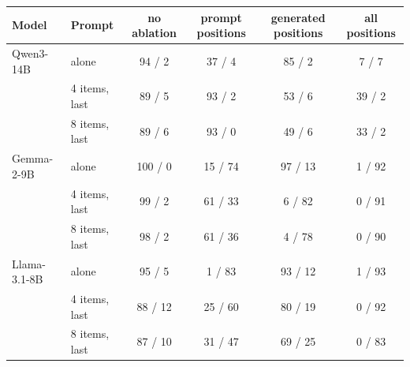 \begin{tabular}{llcccc}
\toprule
Model & Prompt & no ablation & prompt positions & generated positions & all positions \\
\midrule
Qwen3-14B & alone & 94 / 2 & 37 / 4 & 85 / 2 & 7 / 7 \\
 & 4 items, last & 89 / 5 & 93 / 2 & 53 / 6 & 39 / 2 \\
 & 8 items, last & 89 / 6 & 93 / 0 & 49 / 6 & 33 / 2 \\
\midrule
Gemma-2-9B & alone & 100 / 0 & 15 / 74 & 97 / 13 & 1 / 92 \\
 & 4 items, last & 99 / 2 & 61 / 33 & 6 / 82 & 0 / 91 \\
 & 8 items, last & 98 / 2 & 61 / 36 & 4 / 78 & 0 / 90 \\
\midrule
Llama-3.1-8B & alone & 95 / 5 & 1 / 83 & 93 / 12 & 1 / 93 \\
 & 4 items, last & 88 / 12 & 25 / 60 & 80 / 19 & 0 / 92 \\
 & 8 items, last & 87 / 10 & 31 / 47 & 69 / 25 & 0 / 83 \\
\bottomrule
\end{tabular}